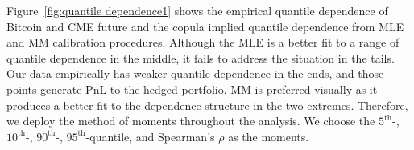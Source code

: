 Figure~\ref{fig:quantile dependence1} shows the empirical quantile dependence of Bitcoin and CME future and the copula implied
quantile dependence from MLE and MM calibration procedures.
Although the MLE is a better fit to a range of quantile dependence in the middle, it fails to address the situation in the tails.
Our data empirically has weaker quantile dependence in the ends, and those points generate PnL to the hedged portfolio.
MM is preferred visually as it produces a better fit to the dependence structure in the two extremes.
Therefore, we deploy the method of moments throughout the analysis.
We choose the $5^\text{th}$-, $10^\text{th}$-, $90^\text{th}$-, $95^\text{th}$-quantile, and Spearman's $\rho$ as the moments.


%
%
%
%
%
